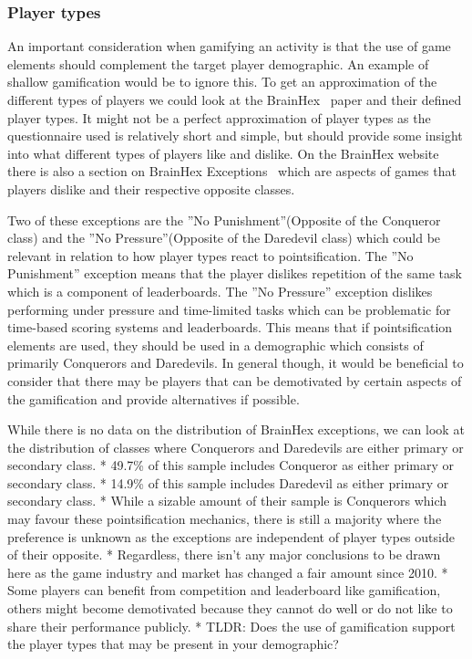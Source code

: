 \subsubsection{Player types}
An important consideration when gamifying an activity is that the use of game elements should complement the target player demographic. An example of shallow gamification would be to ignore this. To get an approximation of the different types of players we could look at the BrainHex~\cite{nacke2014brainhex} paper and their defined player types. It might not be a perfect approximation of player types as the questionnaire used is relatively short and simple, but should provide some insight into what different types of players like and dislike. On the BrainHex website there is also a section on BrainHex Exceptions~\cite{brainhexexceptions} which are aspects of games that players dislike and their respective opposite classes. 

Two of these exceptions are the ''No Punishment''(Opposite of the Conqueror class) and the ''No Pressure''(Opposite of the Daredevil class) which could be relevant in relation to how player types react to pointsification. The ''No Punishment'' exception means that the player dislikes repetition of the same task which is a component of leaderboards. The ''No Pressure'' exception dislikes performing under pressure and time-limited tasks which can be problematic for time-based scoring systems and leaderboards. This means that if pointsification elements are used, they should be used in a demographic which consists of primarily Conquerors and Daredevils. In general though, it would be beneficial to consider that there may be players that can be demotivated by certain aspects of the gamification and provide alternatives if possible. 

While there is no data on the distribution of BrainHex exceptions, we can look at the distribution of classes where Conquerors and Daredevils are either primary or secondary class. 
            * 49.7\% of this sample includes Conqueror as either primary or secondary class.  
            * 14.9\% of this sample includes Daredevil as either primary or secondary class. 
            * While a sizable amount of their sample is Conquerors which may favour these pointsification mechanics, there is still a majority where the preference is unknown as the exceptions are independent of player types outside of their opposite. 
        * Regardless, there isn't any major conclusions to be drawn here as the game industry and market has changed a fair amount since 2010.
    * Some players can benefit from competition and leaderboard like gamification, others might become demotivated because they cannot do well or do not like to share their performance publicly. 
    * TLDR: Does the use of gamification support the player types that may be present in your demographic?
\fi

